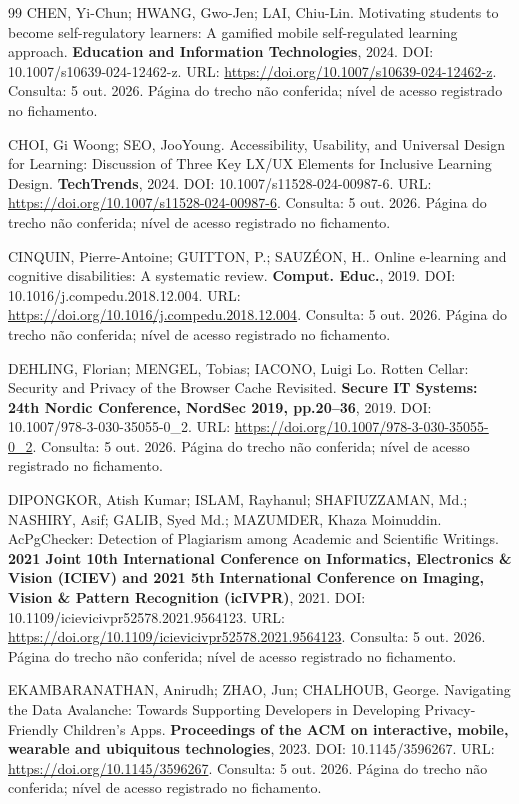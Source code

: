 \begin{thebibliography}{99}
 CHEN, Yi-Chun; HWANG, Gwo-Jen; LAI, Chiu-Lin. Motivating students to become self-regulatory learners: A gamified mobile self-regulated learning approach. \textbf{Education and Information Technologies}, 2024. DOI: 10.1007/s10639-024-12462-z. URL: \url{https://doi.org/10.1007/s10639-024-12462-z}. Consulta: 5 out. 2026. Página do trecho não conferida; nível de acesso registrado no fichamento.


 CHOI, Gi Woong; SEO, JooYoung. Accessibility, Usability, and Universal Design for Learning: Discussion of Three Key LX/UX Elements for Inclusive Learning Design. \textbf{TechTrends}, 2024. DOI: 10.1007/s11528-024-00987-6. URL: \url{https://doi.org/10.1007/s11528-024-00987-6}. Consulta: 5 out. 2026. Página do trecho não conferida; nível de acesso registrado no fichamento.


 CINQUIN, Pierre-Antoine; GUITTON, P.; SAUZÉON, H.. Online e-learning and cognitive disabilities: A systematic review. \textbf{Comput. Educ.}, 2019. DOI: 10.1016/j.compedu.2018.12.004. URL: \url{https://doi.org/10.1016/j.compedu.2018.12.004}. Consulta: 5 out. 2026. Página do trecho não conferida; nível de acesso registrado no fichamento.


 DEHLING, Florian; MENGEL, Tobias; IACONO, Luigi Lo. Rotten Cellar: Security and Privacy of the Browser Cache Revisited. \textbf{Secure IT Systems: 24th Nordic Conference, NordSec 2019, pp.20–36}, 2019. DOI: 10.1007/978-3-030-35055-0\_2. URL: \url{https://doi.org/10.1007/978-3-030-35055-0_2}. Consulta: 5 out. 2026. Página do trecho não conferida; nível de acesso registrado no fichamento.


 DIPONGKOR, Atish Kumar; ISLAM, Rayhanul; SHAFIUZZAMAN, Md.; NASHIRY, Asif; GALIB, Syed Md.; MAZUMDER, Khaza Moinuddin. AcPgChecker: Detection of Plagiarism among Academic and Scientific Writings. \textbf{2021 Joint 10th International Conference on Informatics, Electronics \& Vision (ICIEV) and 2021 5th International Conference on Imaging, Vision \& Pattern Recognition (icIVPR)}, 2021. DOI: 10.1109/icievicivpr52578.2021.9564123. URL: \url{https://doi.org/10.1109/icievicivpr52578.2021.9564123}. Consulta: 5 out. 2026. Página do trecho não conferida; nível de acesso registrado no fichamento.


 EKAMBARANATHAN, Anirudh; ZHAO, Jun; CHALHOUB, George. Navigating the Data Avalanche: Towards Supporting Developers in Developing Privacy-Friendly Children’s Apps. \textbf{Proceedings of the ACM on interactive, mobile, wearable and ubiquitous technologies}, 2023. DOI: 10.1145/3596267. URL: \url{https://doi.org/10.1145/3596267}. Consulta: 5 out. 2026. Página do trecho não conferida; nível de acesso registrado no fichamento.



\end{thebibliography}
